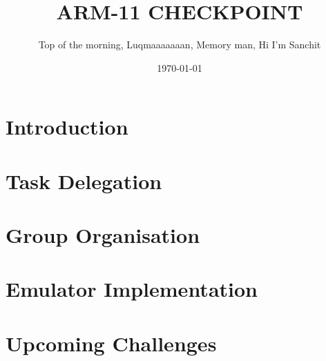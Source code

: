 \documentclass[11pt]{article}
\begin{document}
\title{ARM-11 CHECKPOINT}

\author{Top of the morning, Luqmaaaaaaan, Memory man, Hi I'm Sanchit}

\date{\today}

\maketitle

\section*{Introduction}

\section*{Task Delegation}

\section*{Group Organisation}

\section*{Emulator Implementation}

\section*{Upcoming Challenges}
\end{document}
